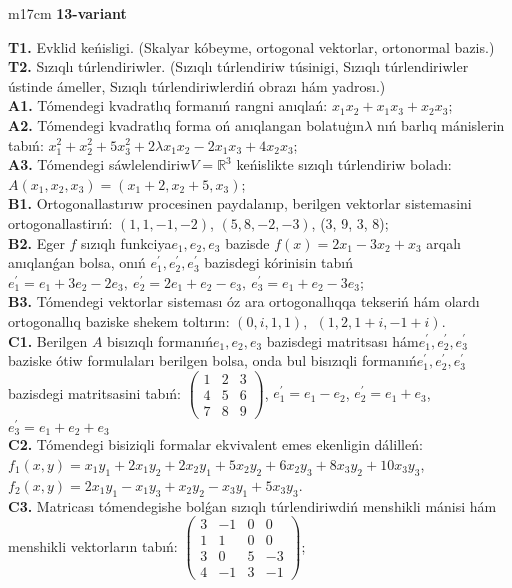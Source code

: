 \documentclass{article}
\begin{document}
\begin{tabular}{m{17cm}}
\textbf{13-variant}
\newline

\textbf{T1.} Evklid keńisligi. (Skalyar kóbeyme, ortogonal vektorlar, ortonormal bazis.) \\
\textbf{T2.} Sızıqlı túrlendiriwler.  (Sızıqlı túrlendiriw túsinigi, Sızıqlı túrlendiriwler ústinde ámeller, Sızıqlı túrlendiriwlerdiń obrazı hám yadrosı.) \\
\textbf{A1.} Tómendegi kvadratlıq formanıń rangni anıqlań: \(x_{1}x_{2} + x_{1}x_{3} + x_{2}x_{3}\); \\
\textbf{A2.} Tómendegi kvadratlıq forma oń anıqlangan bolatuģın\(\lambda\) nıń barlıq mánislerin tabıń: \(x_{1}^{2} + x_{2}^{2} + 5x_{3}^{2} + 2\lambda x_{1}x_{2} - 2x_{1}x_{3} + 4x_{2}x_{3}\); \\
\textbf{A3.} Tómendegi sáwlelendiriw\(V = \mathbb{R}^{3}\) keńislikte sızıqlı túrlendiriw boladı: \(A\left( x_{1},x_{2},x_{3} \right) = \left( x_{1} + 2,x_{2} + 5,x_{3} \right)\); \\
\textbf{B1.} Ortogonallastırıw procesinen paydalanıp, berilgen vektorlar sistemasini ortogonallastirıń: \((1,1, - 1, - 2)\), \((5,8, - 2, - 3)\), (3, 9, 3, 8); \\
\textbf{B2.} Eger \(f\) sızıqlı funkciya\(e_{1},e_{2},e_{3}\) bazisde \(f(x) = 2x_{1} - 3x_{2} + x_{3}\) arqalı anıqlanǵan bolsa, onıń \(e_{1}^{'},e_{2}^{'},e_{3}^{'}\) bazisdegi kórinisin tabıń\(e_{1}^{'} = e_{1} + 3e_{2} - 2e_{3},\ e_{2}^{'} = 2e_{1} + e_{2} - e_{3},\ e_{3}^{'} = e_{1} + e_{2} - 3e_{3}\); \\
\textbf{B3.} Tómendegi vektorlar sisteması óz ara ortogonallıqqa tekseriń hám olardı ortogonallıq baziske shekem toltırın: \((0,i,1,1),\ \ (1,2,1 + i, - 1 + i)\). \\
\textbf{C1.} Berilgen \(A\) bisızıqlı formanıń\(e_{1},e_{2},e_{3}\) bazisdegi matritsası hám\(e_{1}^{'},e_{2}^{'},e_{3}^{'}\) baziske ótiw formulaları berilgen bolsa, onda bul bisızıqli formanıń\(e_{1}^{'},e_{2}^{'},e_{3}^{'}\) bazisdegi matritsasini tabıń: \(\begin{pmatrix} 1 & 2 & 3 \\ 4 & 5 & 6 \\ 7 & 8 & 9 \end{pmatrix}\), \(e_{1}^{'} = e_{1} - e_{2}\), \(e_{2}^{'} = e_{1} + e_{3}\), \(e_{3}^{'} = e_{1} + e_{2} + e_{3}\) \\
\textbf{C2.} Tómendegi bisiziqli formalar ekvivalent emes ekenligin dálilleń:\(f_{1}(x,y) = x_{1}y_{1} + 2x_{1}y_{2} + 2x_{2}y_{1} + 5x_{2}y_{2} + 6x_{2}y_{3} + 8x_{3}y_{2} + 10x_{3}y_{3}\), \(f_{2}(x,y) = 2x_{1}y_{1} - x_{1}y_{3} + x_{2}y_{2} - x_{3}y_{1} + 5x_{3}y_{3}\). \\
\textbf{C3.} Matricası tómendegishe bolǵan sızıqlı túrlendiriwdiń menshikli mánisi hám menshikli vektorların tabıń: \(\begin{pmatrix} 3 & - 1 & 0 & 0 \\ 1 & 1 & 0 & 0 \\ 3 & 0 & 5 & - 3 \\ 4 & - 1 & 3 & - 1 \end{pmatrix}\); \\

\end{tabular}
\end{document}
